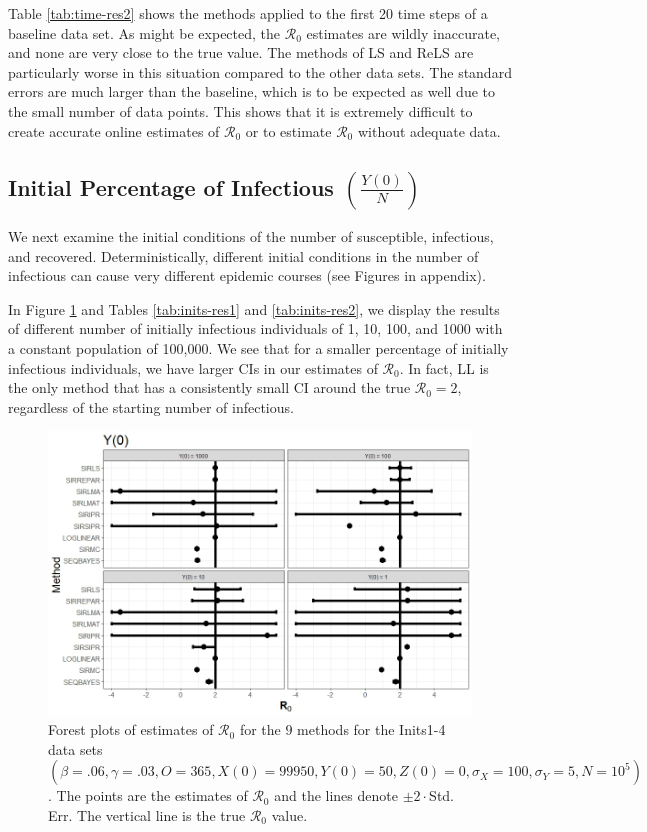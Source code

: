 \documentclass[12pt]{article}
\newcommand{\xxsir}{\ensuremath{9} } %
\newcommand{\rr}{\ensuremath{\mathcal{R}_0}}
\begin{document}
Table \ref{tab:time-res2} shows the methods applied to the first 20 time steps of a baseline data set. As might be expected, the $\rr$ estimates are wildly inaccurate, and none are very close to the true value. The methods of LS and ReLS are particularly worse in this situation compared to the other data sets. The standard errors are much larger than the baseline, which is to be expected as well due to the small number of data points. This shows that it is extremely difficult to create accurate online estimates of $\rr$ or to estimate $\rr$ without adequate data. 

\subsection{Initial Percentage of Infectious $\left (\frac{Y(0)}{N}\right)$}\label{sec:res-inf}
We next examine the initial conditions of the number of susceptible, infectious, and recovered.  Deterministically, different initial conditions in the number of infectious can cause very different epidemic courses (see Figures in appendix).

In Figure \ref{fig:inits-res} and Tables \ref{tab:inits-res1} and \ref{tab:inits-res2}, we display the results of different number of initially infectious individuals of 1, 10, 100, and 1000 with a constant population of 100,000.  We see that for a smaller percentage of initially infectious individuals, we have larger CIs in our estimates of $\rr$.  In fact, LL is the only method that has a consistently small CI around the true $\rr=2$, regardless of the starting number of infectious.



\begin{figure}[H]
  \centering
  \includegraphics[scale=0.5]{images/start.jpeg}
    \caption{Forest plots of estimates of $\rr$ for the \xxsir methods for the Inits1-4 data sets $(\beta=.06, \gamma=.03, O=365, X(0)=99950, Y(0)=50, Z(0)=0, \sigma_X=100, \sigma_Y=5, N=10^5)$.  The points are the estimates of $\rr$ and the lines denote $\pm 2\cdot $Std. Err.  The vertical line is the true $\rr$ value.}\label{fig:inits-res}
  \end{figure}
\end{document}
